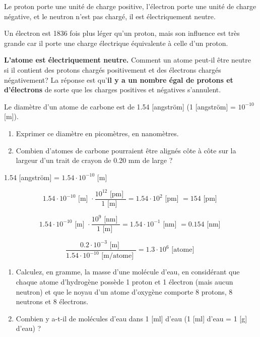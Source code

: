 \documentclass[
  11pt,
  a4paper,
  openany]{book}
\providecommand{\tightlist}{%
  \setlength{\itemsep}{0pt}\setlength{\parskip}{0pt}}
\begin{document}
Le proton porte une unité de charge positive, l'électron porte une unité de charge négative, et le neutron n'est pas chargé, il est électriquement neutre.

Un électron est 1836 fois plus léger qu'un proton, mais son influence est très grande car il porte une charge électrique équivalente à celle d'un proton.

\textbf{L'atome est électriquement neutre.} Comment un atome peut-il être neutre si il contient des protons chargés positivement et des électrons chargés négativement? La réponse est qu'\textbf{il y a un nombre égal de protons et d'électrons} de sorte que les charges positives et négatives s'annulent.

\begin{Exercise}

Le diamètre d'un atome de carbone est de 1.54 {[}angström{]} (1 {[}angström{]} = \(10^{-10}\) {[}m{]}).

\begin{enumerate}
\def\labelenumi{\arabic{enumi}.}
\tightlist
\item
  Exprimer ce diamètre en picomètres, en nanomètres.
\item
  Combien d'atomes de carbone pourraient être alignés côte à côte sur la largeur d'un trait de crayon de 0.20 mm de large ?
\end{enumerate}

\end{Exercise}

\begin{Answer}
1.54 {[}angström{]} = \(1.54\cdot10^{-10}\) {[}m{]}

\[ 1.54\cdot10^{-10} \text{ [m] } \cdot \frac{ 10^{12}\text{ [pm] }}{1\text{ [m] }} = 1.54\cdot10^{2} \text{ [pm] } = 154 \text{ [pm] } \]

\[ 1.54\cdot10^{-10} \text{ [m] } \cdot \frac{ 10^{9}\text{ [nm] }}{1\text{ [m] }} = 1.54\cdot10^{-1} \text{ [nm] } = 0.154 \text{ [nm] } \]

\[ \frac{0.2\cdot10^{-3} \text{ [m] }}{1.54\cdot10^{-10} \text{ [m/atome] }} = 1.3\cdot10^6 \text{ [atome] } \]

\end{Answer}

\begin{Exercise}

\begin{enumerate}
\def\labelenumi{\arabic{enumi}.}
\tightlist
\item
  Calculez, en gramme, la masse d'une molécule d'eau, en considérant que chaque atome d'hydrogène possède 1 proton et 1 électron (mais aucun neutron) et que le noyau d'un atome d'oxygène comporte 8 protons, 8 neutrons et 8 électrons.
\item
  Combien y a-t-il de molécules d'eau dans 1 {[}ml{]} d'eau (1 {[}ml{]} d'eau = 1 {[}g{]} d'eau) ?
\end{enumerate}

\end{Exercise}
\end{document}
